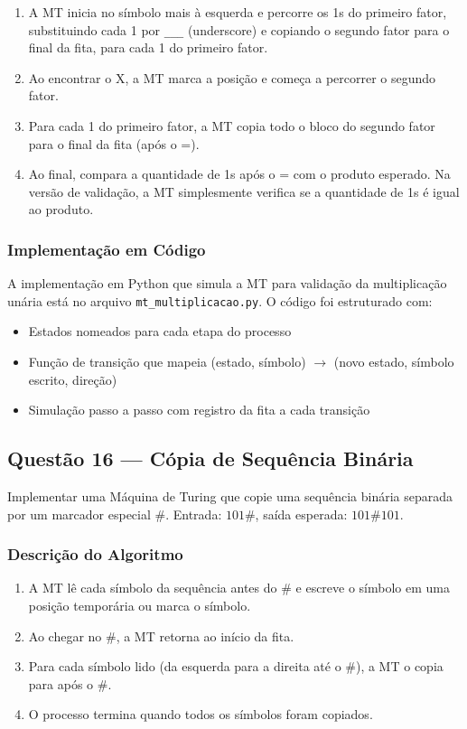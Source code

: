\documentclass[conference]{IEEEtran}
\begin{document}
\begin{enumerate}
  \item A MT inicia no símbolo mais à esquerda e percorre os 1s do primeiro fator, substituindo cada 1 por \texttt{\_\_\_} (underscore) e copiando o segundo fator para o final da fita, para cada 1 do primeiro fator.
  \item Ao encontrar o X, a MT marca a posição e começa a percorrer o segundo fator.
  \item Para cada 1 do primeiro fator, a MT copia todo o bloco do segundo fator para o final da fita (após o =).
  \item Ao final, compara a quantidade de 1s após o = com o produto esperado. Na versão de validação, a MT simplesmente verifica se a quantidade de 1s é igual ao produto.
\end{enumerate}

\subsubsection{Implementação em Código}

A implementação em Python que simula a MT para validação da multiplicação unária está no arquivo \texttt{mt\_multiplicacao.py}. O código foi estruturado com:
\begin{itemize}
  \item Estados nomeados para cada etapa do processo
  \item Função de transição que mapeia (estado, símbolo) $\rightarrow$ (novo estado, símbolo escrito, direção)
  \item Simulação passo a passo com registro da fita a cada transição
\end{itemize}

\subsection{Questão 16 — Cópia de Sequência Binária}

Implementar uma Máquina de Turing que copie uma sequência binária separada por um marcador especial \#. Entrada: $101\#$, saída esperada: $101\#101$.

\subsubsection{Descrição do Algoritmo}

\begin{enumerate}
  \item A MT lê cada símbolo da sequência antes do \# e escreve o símbolo em uma posição temporária ou marca o símbolo.
  \item Ao chegar no \#, a MT retorna ao início da fita.
  \item Para cada símbolo lido (da esquerda para a direita até o \#), a MT o copia para após o \#.
  \item O processo termina quando todos os símbolos foram copiados.
\end{enumerate}
\end{document}
